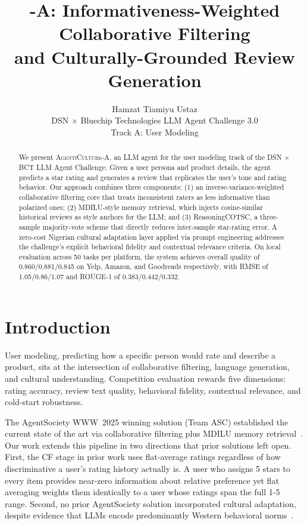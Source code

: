 \documentclass[11pt]{article}
\title{\system-A: Informativeness-Weighted Collaborative Filtering\\
and Culturally-Grounded Review Generation}
\author{
  Hamzat Tiamiyu Ustaz \\
  DSN $\times$ Bluechip Technologies LLM Agent Challenge 3.0 \\
  Track A: User Modeling
}
\newcommand{\system}{\textsc{AgentiCulture}\xspace}
\begin{document}
\maketitle

\begin{abstract}
We present \system-A, an LLM agent for the user modeling track of the
DSN $\times$ BCT LLM Agent Challenge.
Given a user persona and product details, the agent predicts a star rating
and generates a review that replicates the user's tone and rating behavior.
Our approach combines three components: (1) an inverse-variance-weighted
collaborative filtering core that treats inconsistent raters as less informative
than polarized ones; (2) MDILU-style memory retrieval, which injects
cosine-similar historical reviews as style anchors for the LLM; and
(3) ReasoningCOTSC, a three-sample majority-vote scheme that directly
reduces inter-sample star-rating error.
A zero-cost Nigerian cultural adaptation layer applied via prompt engineering
addresses the challenge's explicit behavioral fidelity and contextual relevance
criteria.
On local evaluation across 50 tasks per platform, the system achieves
overall quality of 0.860/0.881/0.845 on Yelp, Amazon, and Goodreads
respectively, with RMSE of 1.05/0.86/1.07 and ROUGE-1 of 0.383/0.442/0.332.
\end{abstract}

\section{Introduction}

User modeling, predicting how a specific person would rate and describe
a product, sits at the intersection of collaborative filtering, language
generation, and cultural understanding.
Competition evaluation rewards five dimensions: rating accuracy, review text
quality, behavioral fidelity, contextual relevance, and cold-start robustness.

The AgentSociety WWW~2025 winning solution (Team ASC) established the current
state of the art via collaborative filtering plus MDILU memory
retrieval~\citep{guo2025agentsocietychallenge}.
Our work extends this pipeline in two directions that prior solutions left open.
First, the CF stage in prior work uses flat-average ratings regardless of how
discriminative a user's rating history actually is.
A user who assigns 5 stars to every item provides near-zero information about
relative preference yet flat averaging weights them identically to a user
whose ratings span the full 1-5 range.
Second, no prior AgentSociety solution incorporated cultural adaptation,
despite evidence that LLMs encode predominantly Western behavioral
norms~\citep{cao2023assessing}.
\end{document}
